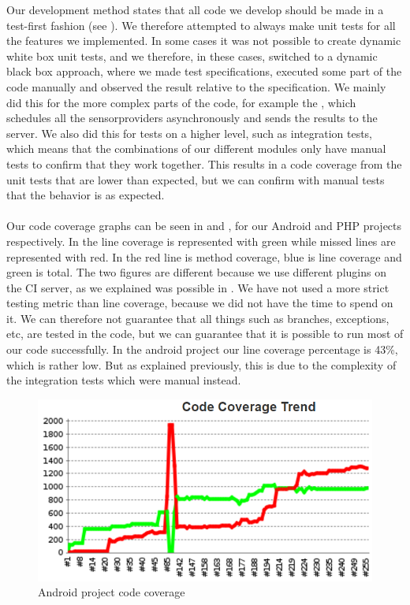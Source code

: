 Our development method states that all code we develop should be made in a test-first fashion (see ). We therefore attempted to always make unit tests for all the features we implemented. In some cases it was not possible to create dynamic white box unit tests, and we therefore, in these cases, switched to a dynamic black box approach, where we made test specifications, executed some part of the code manually and observed the result relative to the specification. We mainly did this for the more complex parts of the code, for example the , which schedules all the sensorproviders asynchronously and sends the results to the server. We also did this for tests on a higher level, such as integration tests, which means that the combinations of our different modules only have manual tests to confirm that they work together. This results in a code coverage from the unit tests that are lower than expected, but we can confirm with manual tests that the behavior is as expected. 
\\\\
Our code coverage graphs can be seen in  and , for our Android and PHP projects respectively. In  the line coverage is represented with green while missed lines are represented with red. In  the red line is method coverage, blue is line coverage and green is total. The two figures are different because we use different plugins on the CI server, as we explained was possible in . We have not used a more strict testing metric than line coverage, because we did not have the time to spend on it. We can therefore not guarantee that all things such as branches, exceptions, etc, are tested in the code, but we can guarantee that it is possible to run most of our code successfully. In the android project our line coverage percentage is 43\%, which is rather low. But as explained previously, this is due to the complexity of the integration tests which were manual instead. 

\begin{figure}[!htbp]
    \centering
    \includegraphics[width=\textwidth]{graphic/quality_assurance/jenkins_android_code_coverage}
    \caption{Android project code coverage}
    \label{fig:android_project_code_coverage}
\end{figure}
\FloatBarrier

